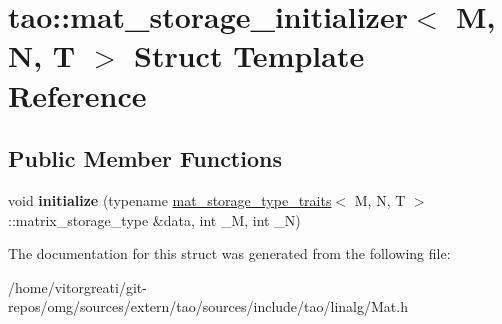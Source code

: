 \hypertarget{structtao_1_1mat__storage__initializer}{}\section{tao\+::mat\+\_\+storage\+\_\+initializer$<$ M, N, T $>$ Struct Template Reference}
\label{structtao_1_1mat__storage__initializer}
\subsection*{Public Member Functions}
\begin{DoxyCompactItemize}
\item 
\mbox{\label{structtao_1_1mat__storage__initializer_a2708ce63e2dd9448f1efdcc5be8b602d}} 
void {\bfseries initialize} (typename \mbox{\hyperlink{structtao_1_1mat__storage__type__traits}{mat\+\_\+storage\+\_\+type\+\_\+traits}}$<$ M, N, T $>$\+::matrix\+\_\+storage\+\_\+type \&data, int \+\_\+M, int \+\_\+N)
\end{DoxyCompactItemize}


The documentation for this struct was generated from the following file\+:\begin{DoxyCompactItemize}
\item 
/home/vitorgreati/git-\/repos/omg/sources/extern/tao/sources/include/tao/linalg/Mat.\+h\end{DoxyCompactItemize}

